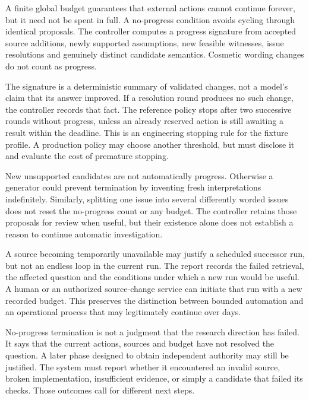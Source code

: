 A finite global budget guarantees that external actions cannot continue forever,
but it need not be spent in full. A no-progress condition avoids cycling through
identical proposals. The controller computes a progress signature from accepted
source additions, newly supported assumptions, new feasible witnesses, issue
resolutions and genuinely distinct candidate semantics. Cosmetic wording changes
do not count as progress.

The signature is a deterministic summary of validated changes, not a model's
claim that its answer improved. If a resolution round produces no such change,
the controller records that fact. The reference policy stops after two successive
rounds without progress, unless an already reserved action is still awaiting a
result within the deadline. This is an engineering stopping rule for the fixture
profile. A production policy may choose another threshold, but must disclose it
and evaluate the cost of premature stopping.


New unsupported candidates are not automatically progress. Otherwise a generator
could prevent termination by inventing fresh interpretations indefinitely.
Similarly, splitting one issue into several differently worded issues does not
reset the no-progress count or any budget. The controller retains those proposals
for review when useful, but their existence alone does not establish a reason to
continue automatic investigation.

A source becoming temporarily unavailable may justify a scheduled successor run,
but not an endless loop in the current run. The report records the failed
retrieval, the affected question and the conditions under which a new run would
be useful. A human or an authorized source-change service can initiate that run
with a new recorded budget. This preserves the distinction between bounded
automation and an operational process that may legitimately continue over days.

No-progress termination is not a judgment that the research direction has failed.
It says that the current actions, sources and budget have not resolved the
question. A later phase designed to obtain independent authority may still be
justified. The system must report whether it encountered an invalid source,
broken implementation, insufficient evidence, or simply a candidate that failed
its checks. Those outcomes call for different next steps.

